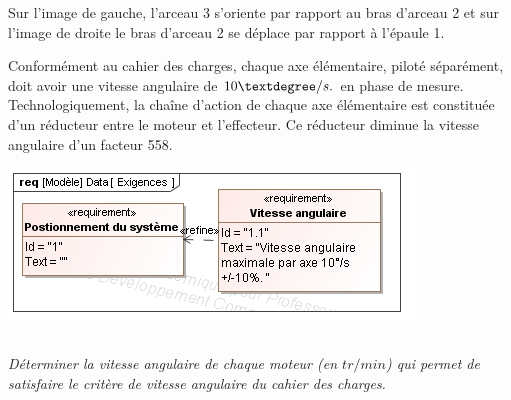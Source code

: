 \documentclass[11pt,oneside]{article}
\begin{document}
{Sur l'image de gauche, l'arceau 3 s'oriente par rapport au bras d'arceau 2 et sur l'image de droite le bras d'arceau 2 se déplace par rapport à l'épaule 1.
\vspace{.25cm}


\begin{minipage}[c]{.47\linewidth}
Conformément au cahier des charges, chaque axe élémentaire, piloté séparément, doit avoir une vitesse angulaire de $10\textdegree/s.$ en phase de mesure. Technologiquement, la chaîne d'action de chaque axe élémentaire est constituée d'un réducteur entre le moteur et l'effecteur. Ce réducteur diminue la vitesse angulaire d'un facteur 558. 
\end{minipage}\hfill
\begin{minipage}[c]{.47\linewidth}
\begin{center}
\includegraphics[width=.95\textwidth]{png/SysML/Exigences}
\end{center}
\end{minipage}
}

\subparagraph{}
\textit{Déterminer la vitesse angulaire de chaque moteur (en $tr/min$) qui permet de satisfaire le critère de vitesse angulaire du cahier des charges.}
\end{document}
